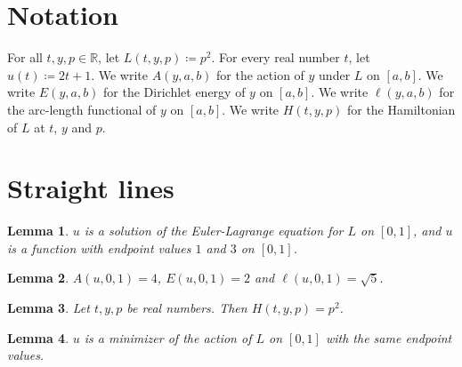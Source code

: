 \documentclass{article}
\newtheorem{lemma}{Lemma}
\begin{document}
\section{Notation}

For all $t,y,p\in\mathbb{R}$, let $L(t,y,p)\coloneqq p^2$.
For every real number $t$, let $u(t)\coloneqq 2t+1$.
We write $A(y,a,b)$ for the action of $y$ under $L$ on $[a,b]$.
We write $E(y,a,b)$ for the Dirichlet energy of $y$ on $[a,b]$.
We write $\ell(y,a,b)$ for the arc-length functional of $y$ on $[a,b]$.
We write $H(t,y,p)$ for the Hamiltonian of $L$ at $t$, $y$ and $p$.

\section{Straight lines}

\begin{lemma}\label{line}
$u$ is a solution of the Euler-Lagrange equation for $L$ on $[0,1]$, and $u$ is a function with endpoint values $1$ and $3$ on $[0,1]$.
\end{lemma}

\begin{lemma}\label{values}
$A(u,0,1)=4$, $E(u,0,1)=2$ and $\ell(u,0,1)=\sqrt5$.
\end{lemma}

\begin{lemma}\label{hamiltonian}
Let $t,y,p$ be real numbers. Then $H(t,y,p)=p^2$.
\end{lemma}

\begin{lemma}\label{minimizer}
$u$ is a minimizer of the action of $L$ on $[0,1]$ with the same endpoint values.
\end{lemma}
\end{document}
